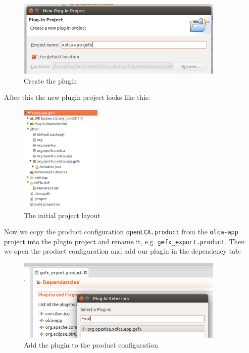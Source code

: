 \documentclass{scrreprt}
\begin{document}
\begin{figure}[H]
\centering
\includegraphics[width=0.9\textwidth]{images/plugin_create.png}
\caption{Create the plugin}
\end{figure}  

After this the new plugin project looks like this:

\begin{figure}[H]
\centering
\includegraphics[height=200px]{images/plugin_initial_project.png}
\caption{The initial project layout}
\end{figure}  

Now we copy the product configuration \texttt{openLCA.product} from the \texttt{olca-app} project into the plugin project and rename it, e.g. \texttt{gefx\_export.product}. Then we open the product configuration and add our plugin in the dependency tab:

\begin{figure}[H]
\centering
\includegraphics[width=0.9\textwidth]{images/plugin_product_config.png}
\caption{Add the plugin to the product configuration}
\end{figure}   
\end{document}
